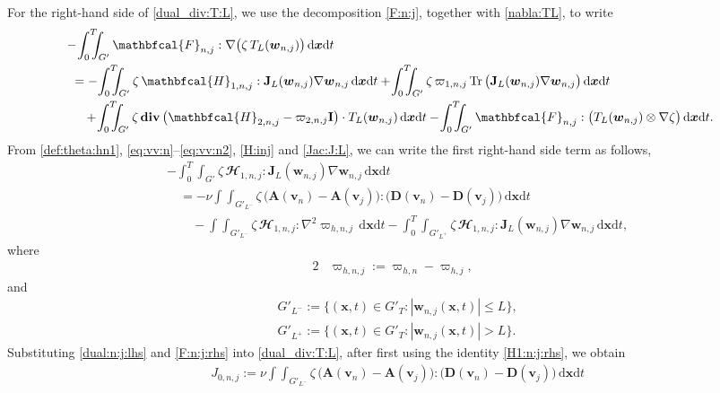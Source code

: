 \documentclass[12pt,reqno]{amsart}
\numberwithin{equation}{section}
\newcommand{\Tr}{\mathop{\mathrm{Tr}}}
\theoremstyle{definition}
\def\dxt{\,\mathrm{d}\boldsymbol{x}\mathrm{d}t}
\def\divv{\mathbf{div}\,}
\def\vv{\boldsymbol{v}}
\def\w{\boldsymbol{w}}
\def\x{\boldsymbol{x}}
\def\bfI{\mathbf{I}}
\def\bfD{\mathbf{D}}
\def\bfA{\mathbf{A}}
\def\bcH{\mathbfcal{H}}
\def\bcF{\mathbfcal{F}}
\def\Tr{\operatorname{Tr}}
\begin{document}
{{{For the right-hand side of \eqref{dual_div:T:L}, we use the decomposition \eqref{F:n:j}, together with \eqref{nabla:TL}, to write
\begin{equation}\label{F:n:j:rhs}
\begin{split}
&\hspace{-2mm} -\!\int_{0}^{T}\!\!\!\!\int_{G'}\bcF_{n,j}: \nabla\big(\zeta\,T_L(\w_{n,j})\big)\dxt  \\
&=
-\!\int_{0}^{T}\!\!\!\!\int_{G'}\zeta\,\bcH_{1,n,j}:\mathbf{J}_L(\w_{n,j})\nabla\w_{n,j}\dxt
+\!\int_{0}^{T}\!\!\!\!\int_{G'}\zeta\,\varpi_{1,n,j}\Tr\big(\mathbf{J}_L(\w_{n,j})\nabla\w_{n,j}\big)\dxt \\
&\quad
+
\!\int_{0}^{T}\!\!\!\!\int_{G'}\zeta\,\divv\big(\bcH_{2,n,j}-\varpi_{2,n,j}\bfI\big)\cdot T_L(\w_{n,j})\dxt
-
\!\int_{0}^{T}\!\!\!\!\int_{G'}\bcF_{n,j}:\big(T_L(\w_{n,j})\otimes\nabla\zeta\big)\dxt.
\end{split}
\end{equation}
From \eqref{def:theta:hn1}, \eqref{eq:vv:n}--\eqref{eq:vv:n2}, \eqref{H:inj} and \eqref{Jac:J:L}, we can write the first right-hand side term as follows,
\begin{equation}\label{H1:n:j:rhs}
\begin{split}
&
-\!\int_{0}^{T}\!\!\!\!\int_{G'}\zeta\,\bcH_{1,n,j}:\mathbf{J}_L(\w_{n,j})\nabla\w_{n,j}\dxt  \\
& \quad =
-
\nu\!\int\!\!\!\!\int_{G'_{L^-}}\zeta\,\big(\bfA(\vv_n)-\bfA(\vv_j)\big):\big(\bfD(\vv_n)-\bfD(\vv_j)\big)\dxt \\
&\qquad
-
\!\int\!\!\!\!\int_{G'_{L^-}}\zeta\,\bcH_{1,n,j}: \nabla^2 \varpi_{h,n,j}\dxt
-\!\int_{0}^{T}\!\!\!\!\int_{G'_{L^+}}\zeta\,\bcH_{1,n,j}:\mathbf{J}_L(\w_{n,j})\nabla\w_{n,j}\dxt,
\end{split}
\end{equation}
where
\begin{alignat}{2}
& \varpi_{h,n,j}:=\varpi_{h,n}-\varpi_{h,j} ,\label{varpi:hnj}
\end{alignat}
and
\begin{align*}
&  G'_{L^-}:=\{(\x,t)\in G'_T:|\w_{n,j}(\x,t)|\leq L\}, \\
&  G'_{L^+}:=\{(\x,t)\in G'_T:|\w_{n,j}(\x,t)|>L\}.
\end{align*}
%
Substituting \eqref{dual:n:j:lhs} and \eqref{F:n:j:rhs} into \eqref{dual_div:T:L}, after first using the identity \eqref{H1:n:j:rhs}, we obtain
\begin{align}\label{Minty:ij:1}\nonumber
&
J_{0,n,j}:=\nu\!\int\!\!\!\!\int_{G'_{L^-}}\zeta\,\big(\bfA(\vv_n)-\bfA(\vv_j)\big):\big(\bfD(\vv_n)-\bfD(\vv_j)\big)\dxt  \\

\end{align}}}}
\end{document}
